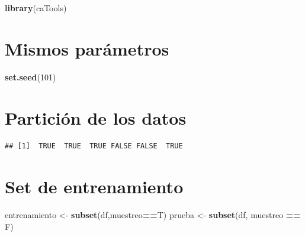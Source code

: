 \documentclass[
]{article}
\newenvironment{Shaded}{\begin{snugshade}}{\end{snugshade}}
\newcommand{\DataTypeTok}[1]{\textcolor[rgb]{0.13,0.29,0.53}{#1}}
\newcommand{\DecValTok}[1]{\textcolor[rgb]{0.00,0.00,0.81}{#1}}
\newcommand{\FloatTok}[1]{\textcolor[rgb]{0.00,0.00,0.81}{#1}}
\newcommand{\KeywordTok}[1]{\textcolor[rgb]{0.13,0.29,0.53}{\textbf{#1}}}
\newcommand{\NormalTok}[1]{#1}
\newcommand{\OperatorTok}[1]{\textcolor[rgb]{0.81,0.36,0.00}{\textbf{#1}}}
\newcommand{\StringTok}[1]{\textcolor[rgb]{0.31,0.60,0.02}{#1}}
\begin{document}
\begin{Shaded}
\begin{Highlighting}[]
\KeywordTok{library}\NormalTok{(caTools)}
\end{Highlighting}
\end{Shaded}

\hypertarget{mismos-paruxe1metros}{%
\section{Mismos parámetros}\label{mismos-paruxe1metros}}

\begin{Shaded}
\begin{Highlighting}[]
\KeywordTok{set.seed}\NormalTok{(}\DecValTok{101}\NormalTok{)}
\end{Highlighting}
\end{Shaded}

\hypertarget{particiuxf3n-de-los-datos}{%
\section{Partición de los datos}\label{particiuxf3n-de-los-datos}}

\begin{Shaded}
\end{Shaded}

\begin{verbatim}
## [1]  TRUE  TRUE  TRUE FALSE FALSE  TRUE
\end{verbatim}

\hypertarget{set-de-entrenamiento}{%
\section{Set de entrenamiento}\label{set-de-entrenamiento}}

\begin{Shaded}
\begin{Highlighting}[]
\NormalTok{entrenamiento <-}\StringTok{ }\KeywordTok{subset}\NormalTok{(df,muestreo}\OperatorTok{==}\NormalTok{T)}
\NormalTok{prueba <-}\StringTok{ }\KeywordTok{subset}\NormalTok{(df, muestreo }\OperatorTok{==}\StringTok{ }\NormalTok{F)}
\end{Highlighting}
\end{Shaded}
\end{document}
